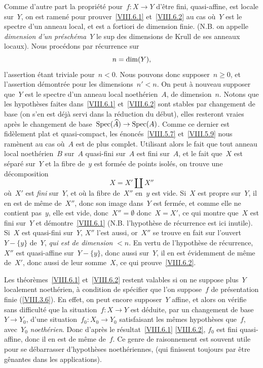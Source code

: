 Comme d'autre part la propri\'et\'e pour~$f\colon X\to Y$
d'\^etre fini, \resp quasi-affine, est locale sur~$Y$, on est
ramen\'e pour prouver~\ref{VIII.6.1} et~\ref{VIII.6.2} au cas
o\`u~$Y$ est le spectre d'un anneau local, et est a fortiori de
dimension finie. (N.B. on appelle \emph{dimension d'un
préschéma}~$Y$ le sup des dimensions de Krull de ses anneaux
locaux). Nous proc\'edons par r\'ecurrence sur~$$
n=\dim(Y),
$$
l'assertion
\'etant triviale pour~$n<0$. Nous pouvons donc supposer~$n\geq 0$,
et l'assertion d\'emontr\'ee pour les dimensions~$n'<n$. On peut
\`a nouveau supposer que~$Y$ est le spectre d'un anneau local
noeth\'erien~$A$, de dimension~$n$. Notons que les hypoth\`eses
faites dans~\ref{VIII.6.1} et~\ref{VIII.6.2} sont stables par
changement de base (on s'en est d\'ej\`a servi dans la r\'eduction
du d\'ebut), elles resteront vraies apr\`es le changement de
base~$\Spec(\widehat{A})\to \Spec(A)$. Comme ce dernier est
fid\`element plat et quasi-compact, les
\'enonc\'es~\ref{VIII.5.7} et~\ref{VIII.5.9} nous ram\`enent au
cas o\`u~$A$ est de plus complet. Utilisant alors le fait que tout
anneau local noeth\'erien~$B$ sur~$A$ quasi-fini sur~$A$ est fini
sur~$A$, et le fait que~$X$ est s\'epar\'e sur~$Y$ et la fibre
de~$y$ est form\'ee de points isol\'es, on trouve une
d\'ecomposition
$$
X=X'\amalg X''
$$
o\`u~$X'$ est \emph{fini} sur~$Y$, et o\`u la fibre de~$X''$
en~$y$ est vide. Si~$X$ est propre sur~$Y$, il en est de m\^eme
de~$X''$, donc son image dans~$Y$ est ferm\'ee, et comme elle ne
contient pas~$y$, elle est vide, donc~$X''=\emptyset$ donc~$X=X'$,
ce qui montre que~$X$ est fini sur~$Y$ et d\'emontre~\ref{VIII.6.1}
(N.B. l'hypoth\`ese de r\'ecurrence est ici inutile). Si~$X$ est
quasi-fini sur~$Y$, $X''$ l'est aussi, or~$X''$ se trouve en fait sur
l'ouvert~$Y-\{ y\}$
de~$Y$, \emph{qui est de dimension} $<n$. En vertu de l'hypoth\`ese
de r\'ecurrence, $X''$ est quasi-affine
sur~$Y-\{ y\}$,
donc aussi sur~$Y$, il en est \'evidemment de m\^eme de~$X'$, donc
aussi de leur somme~$X$, ce qui prouve~\ref{VIII.6.2}.

\begin{remarque}
\label{VIII.6.6}
Les th\'eor\`emes~\ref{VIII.6.1} et~\ref{VIII.6.2} restent
valables si on ne suppose plus~$Y$ localement noeth\'erien, \`a
condition de sp\'ecifier que l'on suppose~$f$ de pr\'esentation
finie
(\cf \ref{VIII.3.6}).
En effet, on peut encore supposer~$Y$ affine, et alors on v\'erifie
sans difficult\'e que la situation~$f\colon X\to Y$ est
d\'eduite,
par un changement de base~$Y\to Y_{0}$, d'une situation~$f_{0}\colon
X_{0}\to Y_{0}$ satisfaisant les m\^emes hypoth\`eses que~$f$,
avec~$Y_{0}$ \emph{noethérien}. Donc d'apr\`es le
r\'esultat~\ref{VIII.6.1} \resp \ref{VIII.6.2}, $f_{0}$ est fini
\resp quasi-affine, donc il en est de m\^eme de~$f$. Ce genre de
raisonnement est souvent utile pour se d\'ebarrasser
d'hypoth\`eses noeth\'eriennes,
(qui finissent toujours par \^etre g\^enantes dans les
applications).
\end{remarque}

